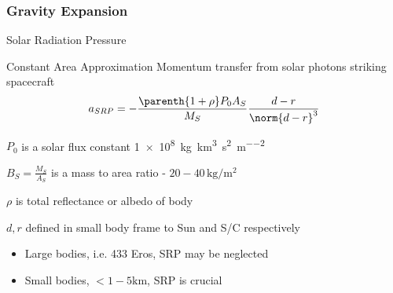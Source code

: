 \begin{frame}[noframenumbering,label=grav] %
\frametitle{Gravity Expansion}
\hyperlink{potential}{}
\end{frame}%


\begin{frame}[noframenumbering,label=srp]{Solar Radiation Pressure} %

\begin{block}{Constant Area Approximation}
Momentum transfer from solar photons striking spacecraft
\begin{align*}
    a_{SRP} = - \frac{\parenth{1 + \rho} P_0 A_{S}}{M_S} \frac{d - r}{\norm{d-r}^3}
\end{align*}

\( P_0\) is a solar flux constant \SI{1e8}{\kilogram\kilo\meter\cubed\per\second\squared\per\meter\squared}

\( B_S = \frac{M_S}{A_S} \) is a mass to area ratio - \( 20 - 40 \, \si{\kilogram\per\meter\squared} \)

\( \rho \) is total reflectance or albedo of body

\( d, r \) defined in small body frame to Sun and S/C respectively
\end{block}
\begin{itemize}
    \item Large bodies, i.e. 433 Eros, SRP may be neglected
    \item Small bodies, \( < 1-5 \si{\kilo\meter} \), SRP is crucial
\end{itemize}
\end{frame} %

